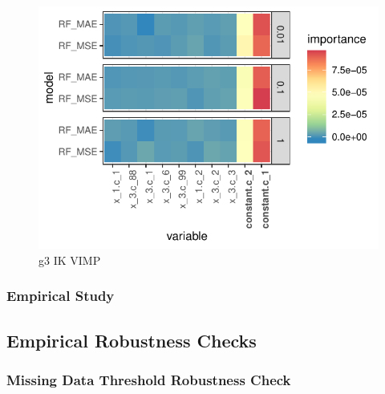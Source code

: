 \documentclass[11pt, a4paper, table]{article}
\begin{document}
\begin{figure}
	\includegraphics[]{../Results/simulation/graphics/simulation_g3_vimp_ik.pdf}
	\caption{g3 IK VIMP}
\end{figure}

\subsubsection{Empirical Study}






\subsection{Empirical Robustness Checks}

\subsubsection{Missing Data Threshold Robustness Check}



%
%
%
%
%
%
%
\end{document}
